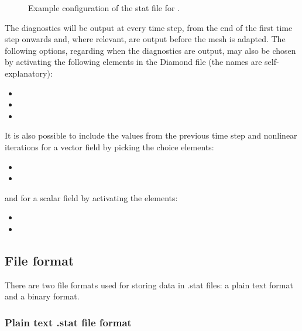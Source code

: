 \begin{figure}[ht]
  \centering
  \caption{Example configuration of the stat file for .}
  \label{fig:diamond_enable_stat}
\end{figure}

The diagnostics will be output at every time step, from the end of the first time step onwards and, where relevant, are output before the mesh is adapted. The following options, regarding when the diagnostics are output, may also be chosen by activating the following elements in the Diamond file (the names are self-explanatory):
\begin{itemize}
\item {}
\item {}
\item {}
\end{itemize}  

It is also possible to include the values from the previous time step and nonlinear iterations for a vector field by picking the choice elements:
\begin{itemize}
\item {}
\item {}
\end{itemize}

and for a scalar field by activating the elements:

\begin{itemize}
\item {}
\item {}
\end{itemize}

\subsection{File format}

There are two file formats used for storing data in .stat files: a plain text format
and a binary format.

\subsubsection{Plain text .stat file format}

